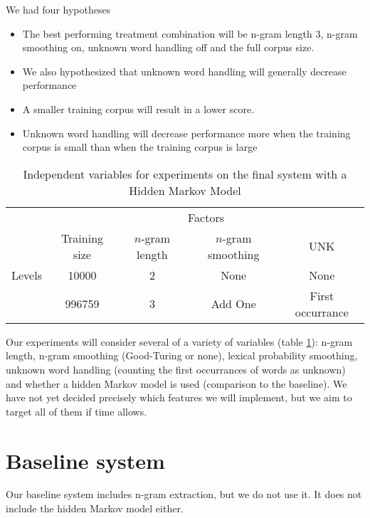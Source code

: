 \documentclass{article}
\begin{document}
We had four hypotheses
\begin{itemize}
\item The best performing treatment combination will be n-gram length 3,
n-gram smoothing on, unknown word handling off and the full corpus size.
\item We also hypothesized that unknown word handling will generally
decrease performance
\item A smaller training corpus will result in a lower score.
\item Unknown word handling will decrease performance more when the
training corpus is small than when the training corpus is large
\end{itemize}

\begin{table}
\begin{tabular}{lcccc}
& \multicolumn{4}{c}{Factors} \\
\cmidrule{2-5}
       & Training size & $n$-gram length & $n$-gram smoothing & UNK\\
\cmidrule{2-5}
Levels &  10000   &  2  & None    & None \\
       & 996759   &  3  & Add One & First occurrance  \\
\cmidrule{2-5}
\end{tabular}
\caption{\label{tab:ind_vars}Independent variables for experiments on the final system with a Hidden Markov Model}
\end{table}

Our experiments will consider several of a variety of variables (table \ref{tab:ind_vars}): n-gram length,
n-gram smoothing (Good-Turing or none), lexical probability smoothing, unknown
word handling (counting the first occurrances of words as unknown) and
whether a hidden Markov model is used (comparison to the baseline).
We have not yet decided precisely which features we will implement, but we
aim to target all of them if time allows.

\section{Baseline system}
Our baseline system includes n-gram extraction,
but we do not use it.
It does not include the hidden Markov model either.
\end{document}
